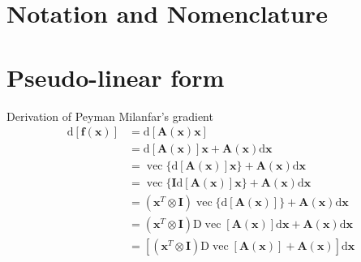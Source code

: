 \documentclass{article}
\begin{document}
\section{Notation and Nomenclature}


\section{Pseudo-linear form}

Derivation of Peyman Milanfar's gradient
\begin{align*}
\mathrm{d}[\mathbf{f}(\mathbf{x})] & =\mathrm{d}[\mathbf{A}(\mathbf{x}) \mathbf{x}] \\
& =\mathrm{d}[\mathbf{A}(\mathbf{x})] \mathbf{x}+\mathbf{A}(\mathbf{x}) \mathrm{d} \mathbf{x} \\
& =\operatorname{vec}\{\mathrm{d}[\mathbf{A}(\mathbf{x})] \mathbf{x}\}+\mathbf{A}(\mathbf{x}) \mathrm{d} \mathbf{x} \\
& =\operatorname{vec}\{\mathbf{I} \mathrm{d}[\mathbf{A}(\mathbf{x})] \mathbf{x}\}+\mathbf{A}(\mathbf{x}) \mathrm{d} \mathbf{x} \\
& =\left(\mathbf{x}^T \otimes \mathbf{I}\right) \operatorname{vec}\{\mathrm{d}[\mathbf{A}(\mathbf{x})]\}+\mathbf{A}(\mathbf{x}) \mathrm{d} \mathbf{x} \\
& =\left(\mathbf{x}^T \otimes \mathbf{I}\right) \mathrm{D} \operatorname{vec}[\mathbf{A}(\mathbf{x})] \mathrm{d} \mathbf{x}+\mathbf{A}(\mathbf{x}) \mathrm{d} \mathbf{x} \\
& =\left[\left(\mathbf{x}^T \otimes \mathbf{I}\right) \mathrm{D} \operatorname{vec}[\mathbf{A}(\mathbf{x})]+\mathbf{A}(\mathbf{x})\right] \mathrm{d} \mathbf{x}
\end{align*}
\end{document}
